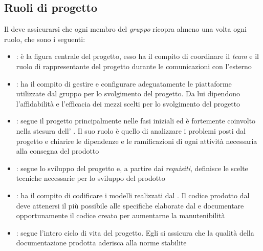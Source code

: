 
\subsection{Ruoli di progetto}
Il \RdP{} deve assicurarsi che ogni membro del \emph{gruppo} ricopra almeno una volta ogni ruolo, che sono i seguenti:
	\begin{itemize}
		\item \textbf{\RdP}: è la figura centrale del progetto, esso ha il compito di coordinare il \emph{team} e il ruolo di rappresentante del progetto durante le comunicazioni con l'esterno
		\item \textbf{\Amm}: ha il compito di gestire e configurare adeguatamente le piattaforme utilizzate dal gruppo per lo svolgimento del progetto. Da lui dipendono l'affidabilità e l'efficacia dei mezzi scelti per lo svolgimento del progetto
		\item \textbf{\Ana}: segue il progetto principalmente nelle fasi iniziali ed è fortemente coinvolto nella stesura dell' \AdR{}. Il suo ruolo è quello di analizzare i problemi posti dal progetto e chiarire le dipendenze e le ramificazioni di ogni attività necessaria alla consegna del prodotto
		\item \textbf{\Prog}: segue lo sviluppo del progetto e, a partire dai \emph{requisiti}, definisce le scelte tecniche necessarie per lo sviluppo del prodotto
		\item \textbf{\Progm}: ha il compito di codificare i modelli realizzati dal \Prog{}. Il codice prodotto dal \Progm{} deve attenersi il più possibile alle specifiche elaborate dal \Prog{} e documentare opportunamente il codice creato per aumentarne la manutenibilità
		\item \textbf{\Ver}: segue l'intero ciclo di vita del progetto. Egli si assicura che la qualità della documentazione prodotta aderisca alla norme stabilite
	\end{itemize}


